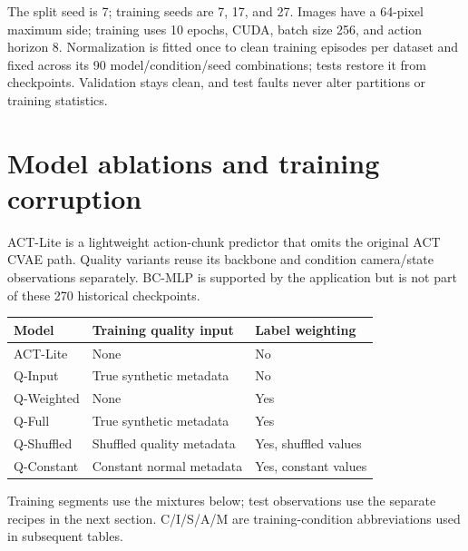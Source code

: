 \documentclass[11pt,a4paper]{article}
\begin{document}
The split seed is 7; training seeds are 7, 17, and 27. Images have a 64-pixel maximum side; training uses 10 epochs, CUDA, batch size 256, and action horizon 8. Normalization is fitted once to clean training episodes per dataset and fixed across its 90 model/condition/seed combinations; tests restore it from checkpoints. Validation stays clean, and test faults never alter partitions or training statistics.

\clearpage\section{Model ablations and training corruption}
ACT-Lite is a lightweight action-chunk predictor that omits the original ACT CVAE path. Quality variants reuse its backbone and condition camera/state observations separately. BC-MLP is supported by the application but is not part of these 270 historical checkpoints.

\begin{center}
\small
\begin{tabular}{lp{68mm}l}
\toprule
Model & Training quality input & Label weighting \\
\midrule
ACT-Lite & None & No \\
Q-Input & True synthetic metadata & No \\
Q-Weighted & None & Yes \\
Q-Full & True synthetic metadata & Yes \\
Q-Shuffled & Shuffled quality metadata & Yes, shuffled values \\
Q-Constant & Constant normal metadata & Yes, constant values \\
\bottomrule
\end{tabular}
\end{center}
Training segments use the mixtures below; test observations use the separate recipes in the next section. C/I/S/A/M are training-condition abbreviations used in subsequent tables.
\end{document}
